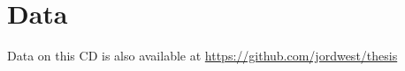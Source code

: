 \documentclass[12pt,a4paper,twoside,openright]{book}
\begin{document}

\chapter{Data}
Data on this CD is also available at \url{https://github.com/jordwest/thesis}
\label{appendix_cd}
\end{document}
